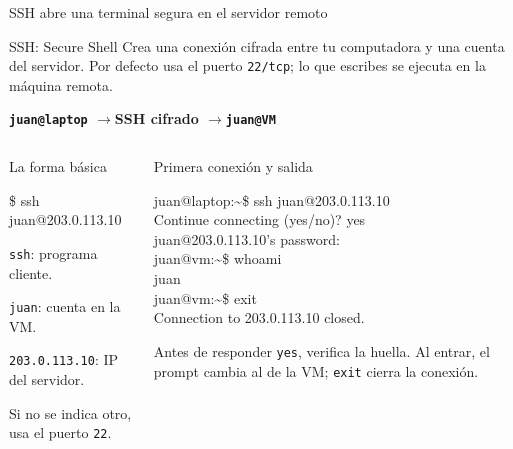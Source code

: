 \documentclass[aspectratio=169,10pt,c]{beamer}
\begin{document}
\begin{frame}{SSH abre una terminal segura en el servidor remoto}
\begin{block}{SSH: Secure Shell}
\small Crea una conexión cifrada entre tu computadora y una cuenta del servidor. Por defecto usa el puerto \texttt{22/tcp}; lo que escribes se ejecuta en la máquina remota.
\end{block}
\begin{center}
{\large\bfseries \texttt{juan@laptop} \quad\(\longrightarrow\)\quad \textcolor{utpRojo}{SSH cifrado} \quad\(\longrightarrow\)\quad \texttt{juan@VM}}
\end{center}
\vspace{-2mm}
\begin{columns}[T,onlytextwidth]
\begin{exampleblock}{La forma básica}
\begin{terminal}\footnotesize
\$ ssh juan@203.0.113.10
\end{terminal}
\footnotesize
\texttt{ssh}: programa cliente.\par\smallskip
\texttt{juan}: cuenta en la VM.\par\smallskip
\texttt{203.0.113.10}: IP del servidor.\par\smallskip
Si no se indica otro, usa el puerto \texttt{22}.
\end{exampleblock}
\begin{exampleblock}{Primera conexión y salida}
\begin{terminal}\scriptsize
juan@laptop:\textasciitilde\$ ssh juan@203.0.113.10\\
Continue connecting (yes/no)? yes\\
juan@203.0.113.10's password:\\
juan@vm:\textasciitilde\$ whoami\\
juan\\
juan@vm:\textasciitilde\$ exit\\
Connection to 203.0.113.10 closed.
\end{terminal}
\footnotesize Antes de responder \texttt{yes}, verifica la huella. Al entrar, el prompt cambia al de la VM; \texttt{exit} cierra la conexión.
\end{exampleblock}
\end{columns}
\end{frame}
\end{document}
